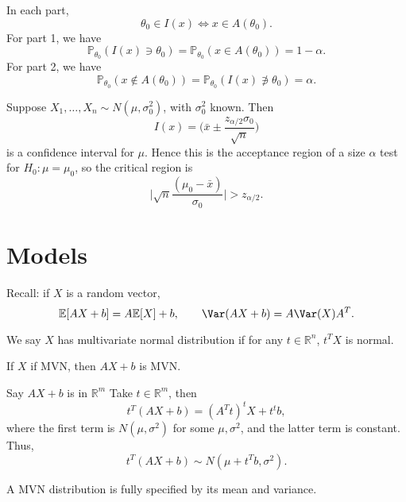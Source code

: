 \documentclass[12pt]{article}
\begin{document}
\begin{proofbox}
	In each part,
	\[
	\theta_0 \in I(x) \iff x \in A(\theta_0).
	\]
	For part 1, we have
	\[
	\mathbb{P}_{\theta_0}(I(x) \ni \theta_0) = \mathbb{P}_{\theta_0}(x \in A(\theta_0)) = 1-\alpha.
	\]
	For part 2, we have
	\[
	\mathbb{P}_{\theta_0}(x \notin A(\theta_0)) = \mathbb{P}_{\theta_0} (I(x) \not\owns \theta_0) = \alpha.
	\]
\end{proofbox}

\begin{exbox}
	Suppose $X_1, \ldots, X_n \sim N(\mu, \sigma_0^2)$, with $\sigma_0^2$ known. Then
	\[
	I(x) = \biggl( \bar x \pm \frac{z_{\alpha/2}\sigma_0}{\sqrt n} \biggr)
	\]
	is a confidence interval for $\mu$. Hence this is the acceptance region of a size $\alpha$ test for $H_0 : \mu = \mu_0$, so the critical region is
	\[
	\biggl| \sqrt n \frac{(\mu_0 - \bar x)}{\sigma_0} \biggr| > z_{\alpha/2}.
	\]
\end{exbox}


\newpage

\section{Models}
\label{sec:models}

Recall: if $X$ is a random vector,
\[
\mathbb{E}[AX + b] = A \mathbb{E}[X] + b, \qquad \Var(AX + b) = A\Var(X)A^{T}.
\]

\begin{definition}
	We say $X$ has multivariate normal distribution if for any $t \in \mathbb{R}^{n}$, $t^{T}X$ is normal.
\end{definition}

\begin{proposition}
	If $X$ if MVN, then $AX + b$ is MVN.
\end{proposition}

\begin{proofbox}
	Say $AX + b$ is in $\mathbb{R}^{m}$ Take $t \in \mathbb{R}^{m}$, then
	\[
	t^{T}(AX + b) = (A^{T}t)^{t}X + t^{t}b,
	\]
	where the first term is $N(\mu, \sigma^2)$ for some $\mu, \sigma^2$, and the latter term is constant. Thus,
	\[
	t^{T}(AX + b) \sim N(\mu + t^{T}b, \sigma^2).
	\]
\end{proofbox}

\begin{proposition}
	A MVN distribution is fully specified by its mean and variance.
\end{proposition}
\end{document}
